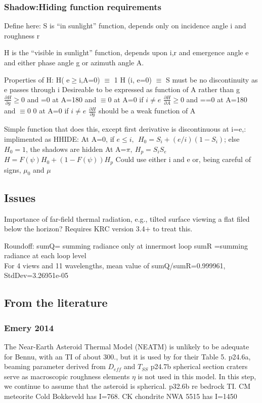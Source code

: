 \documentclass{article}
\begin{document}
\subsubsection{Shadow:Hiding function requirements}  %

 Define here: S is  ``in sunlight'' function, depends only on incidence angle i and roughness r

H is the ``visible in sunlight'' function, depends upon i,r and emergence angle e and either phase angle g or azimuth angle A. 

 Properties of H:
\qi H( e$\geq$i,A=0)  $\equiv $ 1
\qi H (i, e=0) $\equiv $ S
\qi must be no discontinuity as e passes through i
\qi Desireable to be expressed as function of A rather than  g
\qi $\frac{\partial H}{\partial g} \geq 0$ and =0 at A=180\qd
\qii and $\equiv 0$ at A=0 if $ i \neq e $
\qi $\frac{\partial H}{\partial A} \geq 0$ and ==0 at A=180\qd
\qii and $\equiv 0$ 0 at A=0 if $ i \neq e $
\qi $\frac{\partial H}{\partial g} $ should be a weak function of A

Simple function that does this, except first derivative is discontinuous at i=e,: implimented as HHIDE: 
\qi At A=0, if $e \leq i, \ \  H_0=S_i+(e/i)(1-S_i)$; else $H_0=1$, the shadows are hidden
\qi At A=$\pi, \ H_p=S_iS_e$
\\ $H=F(\psi)H_0 +  \left( 1-F(\psi) \right) H_p$
\qi Could use either i and e or, being careful of signs, $\mu_0$ and $\mu$


 

\subsection{Issues}  %
Importance of far-field thermal radiation, e.g., tilted surface viewing a flat
filed below the horizon? Requires KRC version 3.4+ to treat this.

 Roundoff:
\qi sumQ= summing radiance only at innermost loop 
\qi sumR =summing radiance at each loop level
\\ For 4 views and 11 wavelengths, mean value of sumQ/sumR=0.999961, StdDev=3.26951e-05

\subsection{From the literature}

\subsubsection{Emery 2014}
The Near-Earth Asteroid Thermal Model (NEATM)  is unlikely to be
adequate for Bennu, with an TI of about 300., but it is used by 
for their Table 5.
\qi p24.6a, beaming parameter derived from $D_{eff}$ and $T_{SS}$
\qi p24.7b spherical section craters serve as macroscopic roughness elements 
\qi $\eta$ is not used in this model. In this step, we continue to assume that the
asteroid is spherical.
\qi p32.6b re bedrock TI. CM meteorite Cold Bokkeveld has I=768. CK chondrite NWA 5515 has I=1450 
\end{document}
